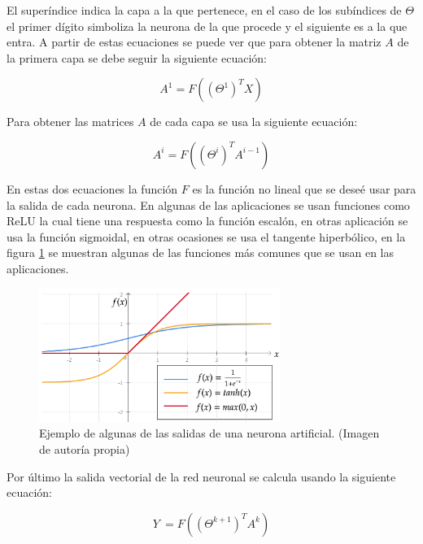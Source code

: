 \par El superíndice indica la capa a la que pertenece, en el caso de los subíndices de $\Theta$ el primer dígito simboliza la neurona de la que procede y el siguiente es a la que entra. A partir de estas ecuaciones se puede ver que para obtener la matriz $A$ de la primera capa se debe seguir la siguiente ecuación:

\begin{equation}
	A^{1} =F\left(\left( \Theta ^{1}\right)^{T} X\right)
\end{equation}

\par Para obtener las matrices $A$ de cada capa se usa la siguiente ecuación:

\begin{equation}
	A^{i} =F\left(\left( \Theta ^{i}\right)^{T} A^{i-1}\right)
\end{equation}

\par En estas dos ecuaciones la función $F$ es la función no lineal que se deseé usar para la salida de cada neurona. En algunas de las aplicaciones se usan funciones como \gls{ReLU} la cual tiene una respuesta como la función escalón, en otras aplicación se usa la función sigmoidal, en otras ocasiones se usa el tangente hiperbólico, en la figura \ref{fig:funciones} se muestran algunas de las funciones más comunes que se usan en las aplicaciones.
\begin{figure}
	\centering
	\includegraphics[width=0.7\textwidth]{imagenes/graficaF.png}
	\caption{Ejemplo de algunas de las salidas de una neurona artificial. (Imagen de autoría propia)}
	\label{fig:funciones}
\end{figure}
\par Por último la salida vectorial de la red neuronal se calcula usando la siguiente ecuación:

\begin{equation}
	Y\ =F\left(\left( \Theta ^{k+1}\right)^{T} A^{k}\right)
\end{equation}

